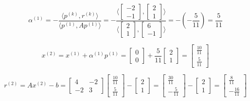 \documentclass[12pt]{article}
\begin{document}
\begin{enumerate}
\[ \alpha^{(1)} = - \frac{\langle p^{(k)}, r^{(k)} \rangle}{\langle p^{(1)}, Ap^{(1)}\rangle} = - \frac{\langle \begin{bmatrix}
-2 \\
-1
\end{bmatrix},\begin{bmatrix}
2 \\
1
\end{bmatrix}\rangle}{\langle \begin{bmatrix}
2 \\
1
\end{bmatrix}, \begin{bmatrix}
6 \\
-1
\end{bmatrix} \rangle} = - \left(-\frac{5}{11}\right) = \frac{5}{11}\]

\[x^{(2)} = x^{(1)} + \alpha^{(1)}p^{(1)} = \begin{bmatrix}
0 \\
0
\end{bmatrix} + \frac{5}{11} \begin{bmatrix}
2 \\
1
\end{bmatrix} =\begin{bmatrix}
\frac{10}{11} \\
\frac{5}{11}
\end{bmatrix}\]

\[ r^{(2)} = Ax^{(2)} - b = \begin{bmatrix}
4 & -2 \\
-2 & 3
\end{bmatrix}\begin{bmatrix}
\frac{10}{11} \\
\frac{5}{11}
\end{bmatrix} - \begin{bmatrix}
2 \\
1
\end{bmatrix} = \begin{bmatrix}
\frac{30}{11} \\
-\frac{5}{11}
\end{bmatrix} - \begin{bmatrix}
2 \\
1
\end{bmatrix} = \begin{bmatrix}
\frac{8}{11} \\
-\frac{16}{11}
\end{bmatrix}\]


\end{enumerate}
\end{document}
